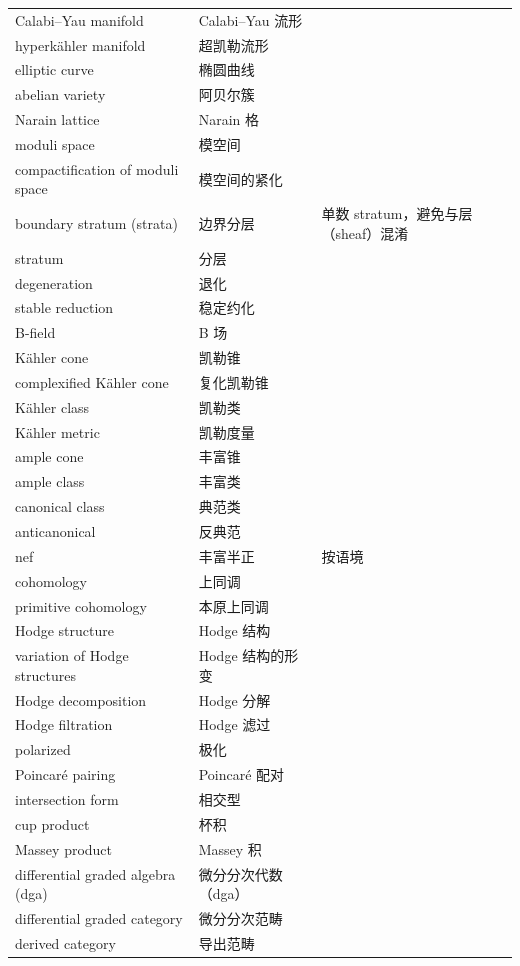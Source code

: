 \begin{longtable}{@{}p{}p{}p{}@{}}
Calabi–Yau manifold & Calabi–Yau 流形 &  \\
hyperkähler manifold & 超凯勒流形 &  \\
elliptic curve & 椭圆曲线 &  \\
abelian variety & 阿贝尔簇 &  \\
Narain lattice & Narain 格 &  \\
moduli space & 模空间 &  \\
compactification of moduli space & 模空间的紧化 &  \\
boundary stratum (strata) & 边界分层 & 单数 stratum，避免与层（sheaf）混淆 \\
stratum & 分层 &  \\
degeneration & 退化 &  \\
stable reduction & 稳定约化 &  \\
B-field & B 场 &  \\
Kähler cone & 凯勒锥 &  \\
complexified Kähler cone & 复化凯勒锥 &  \\
Kähler class & 凯勒类 &  \\
Kähler metric & 凯勒度量 &  \\
ample cone & 丰富锥 &  \\
ample class & 丰富类 &  \\
canonical class & 典范类 &  \\
anticanonical & 反典范 &  \\
nef & 丰富半正 & 按语境 \\
cohomology & 上同调 &  \\
primitive cohomology & 本原上同调 &  \\
Hodge structure & Hodge 结构 &  \\
variation of Hodge structures & Hodge 结构的形变 &  \\
Hodge decomposition & Hodge 分解 &  \\
Hodge filtration & Hodge 滤过 &  \\
polarized & 极化 &  \\
Poincaré pairing & Poincaré 配对 &  \\
intersection form & 相交型 &  \\
cup product & 杯积 &  \\
Massey product & Massey 积 &  \\
differential graded algebra (dga) & 微分分次代数（dga） &  \\
differential graded category & 微分分次范畴 &  \\
derived category & 导出范畴 &  \\

\end{longtable}
